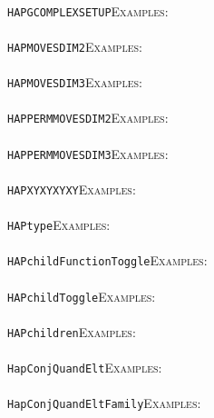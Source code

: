\documentclass[a4paper,11pt]{report}
\begin{document}
{{ \\
 \texttt{HAP{\textunderscore}GCOMPLEX{\textunderscore}SETUP}{\nobreakspace}{\nobreakspace}{\nobreakspace}{\nobreakspace}\textsc{Examples:} \\
 \\
 \texttt{HAP{\textunderscore}MOVES{\textunderscore}DIM{\textunderscore}2}{\nobreakspace}{\nobreakspace}{\nobreakspace}{\nobreakspace}\textsc{Examples:} \\
 \\
 \texttt{HAP{\textunderscore}MOVES{\textunderscore}DIM{\textunderscore}3}{\nobreakspace}{\nobreakspace}{\nobreakspace}{\nobreakspace}\textsc{Examples:} \\
 \\
 \texttt{HAP{\textunderscore}PERMMOVES{\textunderscore}DIM{\textunderscore}2}{\nobreakspace}{\nobreakspace}{\nobreakspace}{\nobreakspace}\textsc{Examples:} \\
 \\
 \texttt{HAP{\textunderscore}PERMMOVES{\textunderscore}DIM{\textunderscore}3}{\nobreakspace}{\nobreakspace}{\nobreakspace}{\nobreakspace}\textsc{Examples:} \\
 \\
 \texttt{HAP{\textunderscore}XYXYXYXY}{\nobreakspace}{\nobreakspace}{\nobreakspace}{\nobreakspace}\textsc{Examples:} \\
 \\
 \texttt{HAP{\textunderscore}type}{\nobreakspace}{\nobreakspace}{\nobreakspace}{\nobreakspace}\textsc{Examples:} \\
 \\
 \texttt{HAPchildFunctionToggle}{\nobreakspace}{\nobreakspace}{\nobreakspace}{\nobreakspace}\textsc{Examples:} \\
 \\
 \texttt{HAPchildToggle}{\nobreakspace}{\nobreakspace}{\nobreakspace}{\nobreakspace}\textsc{Examples:} \\
 \\
 \texttt{HAPchildren}{\nobreakspace}{\nobreakspace}{\nobreakspace}{\nobreakspace}\textsc{Examples:} \\
 \\
 \texttt{HapConjQuandElt}{\nobreakspace}{\nobreakspace}{\nobreakspace}{\nobreakspace}\textsc{Examples:} \\
 \\
 \texttt{HapConjQuandEltFamily}{\nobreakspace}{\nobreakspace}{\nobreakspace}{\nobreakspace}\textsc{Examples:} \\
 \\
}}
\end{document}
